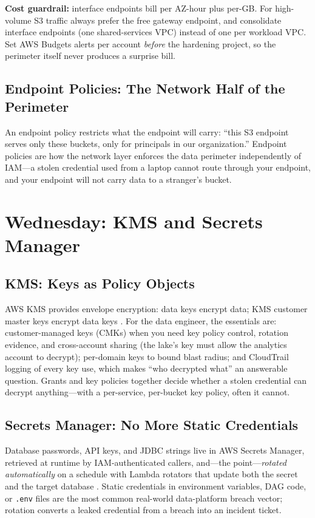 \begin{notebox}
\textbf{Cost guardrail:} interface endpoints bill per AZ-hour plus per-GB. For high-volume S3 traffic always prefer the free gateway endpoint, and consolidate interface endpoints (one shared-services VPC) instead of one per workload VPC. Set AWS Budgets alerts per account \emph{before} the hardening project, so the perimeter itself never produces a surprise bill.
\end{notebox}

\subsection{Endpoint Policies: The Network Half of the Perimeter}
An endpoint policy restricts what the endpoint will carry: ``this S3 endpoint serves only these buckets, only for principals in our organization.'' Endpoint policies are how the network layer enforces the data perimeter independently of IAM---a stolen credential used from a laptop cannot route through your endpoint, and your endpoint will not carry data to a stranger's bucket.

\section{Wednesday: KMS and Secrets Manager}
\subsection{KMS: Keys as Policy Objects}
AWS KMS provides envelope encryption: data keys encrypt data; KMS customer master keys encrypt data keys \cite{awsKMSDocs}. For the data engineer, the essentials are: customer-managed keys (CMKs) when you need key policy control, rotation evidence, and cross-account sharing (the lake's key must allow the analytics account to decrypt); per-domain keys to bound blast radius; and CloudTrail logging of every key use, which makes ``who decrypted what'' an answerable question. Grants and key policies together decide whether a stolen credential can decrypt anything---with a per-service, per-bucket key policy, often it cannot.

\subsection{Secrets Manager: No More Static Credentials}
Database passwords, API keys, and JDBC strings live in AWS Secrets Manager, retrieved at runtime by IAM-authenticated callers, and---the point---\emph{rotated automatically} on a schedule with Lambda rotators that update both the secret and the target database \cite{awsSecretsManagerDocs}. Static credentials in environment variables, DAG code, or \texttt{.env} files are the most common real-world data-platform breach vector; rotation converts a leaked credential from a breach into an incident ticket.

